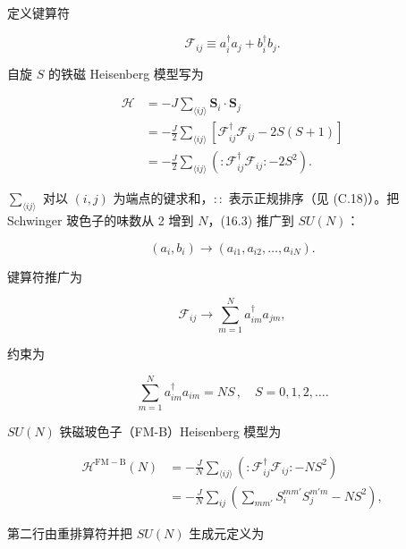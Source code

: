 定义键算符

\begin{equation*}
\mathcal {F} _ {ij} \equiv a _ {i} ^ {\dagger} a _ {j} + b _ {i} ^ {\dagger} b _ {j}.
\tag{16.2}
\end{equation*}

自旋 $S$ 的铁磁 Heisenberg 模型写为

\begin{align*}
\mathcal {H} & = - J \sum_{\langle ij \rangle} \mathbf {S} _ {i} \cdot \mathbf {S} _ {j}\\
& = - \frac {J}{2} \sum_{\langle ij \rangle} \left[ \mathcal {F} _ {ij} ^ {\dagger} \mathcal {F} _ {ij} - 2 S ( S + 1 ) \right]\\
& = - \frac {J}{2} \sum_{\langle ij \rangle} \left( : \mathcal {F} _ {ij} ^ {\dagger} \mathcal {F} _ {ij} : - 2 S ^ {2} \right) .
\tag{16.3}
\end{align*}

$\sum_{\langle ij\rangle}$ 对以 $(i,j)$ 为端点的键求和，$: :$ 表示正规排序（见 (C.18)）。把 Schwinger 玻色子的味数从 2 增到 $N$，(16.3) 推广到 $SU(N)$：

\begin{equation*}
\left( a _ {i}, b _ {i} \right) \rightarrow \left( a _ {i 1}, a _ {i 2}, \dots , a _ {iN} \right).
\tag{16.4}
\end{equation*}

键算符推广为

\begin{equation*}
\mathcal {F} _ {ij} \rightarrow \sum_ {m = 1} ^ {N} a _ {im} ^ {\dagger} a _ {jm} ,
\tag{16.5}
\end{equation*}

约束为

\begin{equation*}
\sum_ {m = 1} ^ {N} a _ {im} ^ {\dagger} a _ {im} = NS \, , \quad S = 0, 1, 2, \ldots .
\tag{16.6}
\end{equation*}

$SU(N)$ 铁磁玻色子（FM-B）Heisenberg 模型为

\begin{align*}
\mathcal {H} ^ {\mathrm{FM-B}} ( N ) & = - \frac {J}{N} \sum_{\langle ij \rangle} \left( : \mathcal {F} _ {ij} ^ {\dagger} \mathcal {F} _ {ij} : - NS ^ {2} \right)\\
& = - \frac {J}{N} \sum_ {ij} \left( \sum_ {mm '} S _ {i} ^ {mm '} S _ {j} ^ {m'm} - NS ^ {2} \right) ,
\tag{16.7}
\end{align*}

第二行由重排算符并把 $SU(N)$ 生成元定义为

